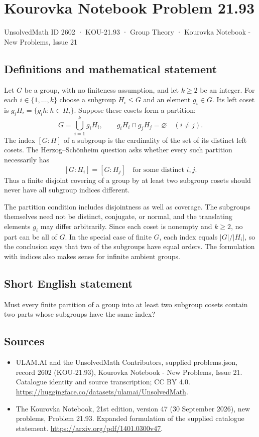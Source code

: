 \documentclass[11pt,a4paper]{article}
\begin{document}
\section*{Kourovka Notebook Problem 21.93}\label{2602}
{\small UnsolvedMath ID 2602 · KOU-21.93 · Group Theory · Kourovka Notebook - New Problems, Issue 21}
\subsection{Definitions and mathematical statement}
Let $G$ be a group, with no finiteness assumption, and let $k\ge2$ be an integer. For each $i\in\{1,\ldots,k\}$ choose a subgroup $H_i\le G$ and an element $g_i\in G$. Its left coset is $g_iH_i=\{g_ih:h\in H_i\}$. Suppose these cosets form a partition:
\[
 G=\bigcup_{i=1}^{k}g_iH_i,
 \qquad g_iH_i\cap g_jH_j=\varnothing\quad(i\ne j).
\]
The index $[G:H]$ of a subgroup is the cardinality of the set of its distinct left cosets. The Herzog--Sch\"onheim question asks whether every such partition necessarily has
\[
 [G:H_i]=[G:H_j]\quad\text{for some distinct }i,j.
\]
Thus a finite disjoint covering of a group by at least two subgroup cosets should never have all subgroup indices different.

The partition condition includes disjointness as well as coverage. The subgroups themselves need not be distinct, conjugate, or normal, and the translating elements $g_i$ may differ arbitrarily. Since each coset is nonempty and $k\ge2$, no part can be all of $G$. In the special case of finite $G$, each index equals $|G|/|H_i|$, so the conclusion says that two of the subgroups have equal orders. The formulation with indices also makes sense for infinite ambient groups.
\subsection{Short English statement}
Must every finite partition of a group into at least two subgroup cosets contain two parts whose subgroups have the same index?
\subsection{Sources}
\begin{itemize}
\item[S1] ULAM.AI and the UnsolvedMath Contributors, supplied problems.json, record 2602 (KOU-21.93), Kourovka Notebook - New Problems, Issue 21. Catalogue identity and source transcription; CC BY 4.0.
\url{https://huggingface.co/datasets/ulamai/UnsolvedMath}.
\item[S2] The Kourovka Notebook, 21st edition, version 47 (30 September 2026), new problems, Problem 21.93. Expanded formulation of the supplied catalogue statement.
\url{https://arxiv.org/pdf/1401.0300v47}.
\end{itemize}
\end{document}
